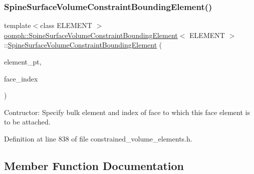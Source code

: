 \subsubsection{\texorpdfstring{Spine\+Surface\+Volume\+Constraint\+Bounding\+Element()}{SpineSurfaceVolumeConstraintBoundingElement()}}
{\footnotesize\ttfamily template$<$class E\+L\+E\+M\+E\+NT $>$ \\
\hyperlink{classoomph_1_1SpineSurfaceVolumeConstraintBoundingElement}{oomph\+::\+Spine\+Surface\+Volume\+Constraint\+Bounding\+Element}$<$ E\+L\+E\+M\+E\+NT $>$\+::\hyperlink{classoomph_1_1SpineSurfaceVolumeConstraintBoundingElement}{Spine\+Surface\+Volume\+Constraint\+Bounding\+Element} (\begin{DoxyParamCaption}\item[{Finite\+Element $\ast$const \&}]{element\+\_\+pt,  }\item[{const int \&}]{face\+\_\+index }\end{DoxyParamCaption})\hspace{0.3cm}{\ttfamily [inline]}}



Contructor\+: Specify bulk element and index of face to which this face element is to be attached. 



Definition at line 838 of file constrained\+\_\+volume\+\_\+elements.\+h.



\subsection{Member Function Documentation}
\mbox{\label{classoomph_1_1SpineSurfaceVolumeConstraintBoundingElement_a5eec2e025f24120c6f2a959da70bb5b1}} 
